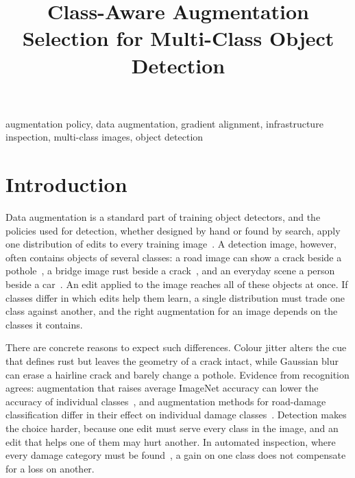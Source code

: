 \title{Class-Aware Augmentation Selection for Multi-Class Object Detection}
\maketitle


\begin{IEEEkeywords}
augmentation policy, data augmentation, gradient alignment, infrastructure inspection, multi-class images, object detection
\end{IEEEkeywords}

\section{Introduction}
\label{sec:intro}

Data augmentation is a standard part of training object detectors, and the policies used for detection, whether designed by hand or found by search, apply one distribution of edits to every training image~\cite{zoph2020det,chen2021scale}. A detection image, however, often contains objects of several classes: a road image can show a crack beside a pothole~\cite{arya2024rdd}, a bridge image rust beside a crack~\cite{flotzinger2024dacl10k}, and an everyday scene a person beside a car~\cite{everingham2010voc}. An edit applied to the image reaches all of these objects at once. If classes differ in which edits help them learn, a single distribution must trade one class against another, and the right augmentation for an image depends on the classes it contains.

There are concrete reasons to expect such differences. Colour jitter alters the cue that defines rust but leaves the geometry of a crack intact, while Gaussian blur can erase a hairline crack and barely change a pothole. Evidence from recognition agrees: augmentation that raises average ImageNet accuracy can lower the accuracy of individual classes~\cite{kirichenko2023}, and augmentation methods for road-damage classification differ in their effect on individual damage classes~\cite{tsuchiya2019}. Detection makes the choice harder, because one edit must serve every class in the image, and an edit that helps one of them may hurt another. In automated inspection, where every damage category must be found~\cite{shang2024automated,zheng2024deep,vision2025inspection}, a gain on one class does not compensate for a loss on another.

